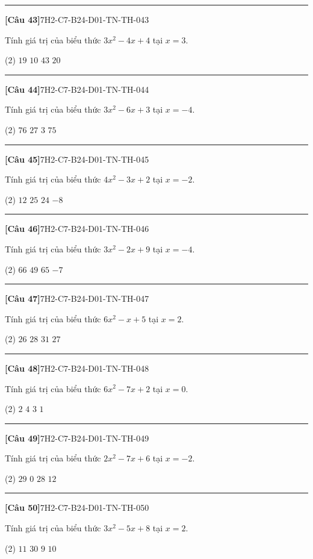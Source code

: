 \documentclass[12pt,a4paper]{article}
\newif\ifloigiai
\newenvironment{cauhoi}[2]{%
  \par\medskip\noindent\rule{\textwidth}{0.4pt}\par\nopagebreak
  \noindent\textbf{[#1]}\hfill{\scriptsize\ttfamily #2}\par\nopagebreak\smallskip}{\par}
\newcommand{\dapan}[1]{\ifloigiai\par\smallskip\noindent\textit{Đáp án:} \textbf{#1}\par\fi}
\begin{document}
\begin{cauhoi}{Câu 43}{7H2-C7-B24-D01-TN-TH-043}
Tính giá trị của biểu thức $3x^{2}-4x+4$ tại $x=3$.
\begin{tasks}(2)
\task $19$
\task $10$
\task $43$
\task $20$
\end{tasks}
\dapan{A}
\end{cauhoi}
\begin{cauhoi}{Câu 44}{7H2-C7-B24-D01-TN-TH-044}
Tính giá trị của biểu thức $3x^{2}-6x+3$ tại $x=-4$.
\begin{tasks}(2)
\task $76$
\task $27$
\task $3$
\task $75$
\end{tasks}
\dapan{D}
\end{cauhoi}
\begin{cauhoi}{Câu 45}{7H2-C7-B24-D01-TN-TH-045}
Tính giá trị của biểu thức $4x^{2}-3x+2$ tại $x=-2$.
\begin{tasks}(2)
\task $12$
\task $25$
\task $24$
\task $-8$
\end{tasks}
\dapan{C}
\end{cauhoi}
\begin{cauhoi}{Câu 46}{7H2-C7-B24-D01-TN-TH-046}
Tính giá trị của biểu thức $3x^{2}-2x+9$ tại $x=-4$.
\begin{tasks}(2)
\task $66$
\task $49$
\task $65$
\task $-7$
\end{tasks}
\dapan{C}
\end{cauhoi}
\begin{cauhoi}{Câu 47}{7H2-C7-B24-D01-TN-TH-047}
Tính giá trị của biểu thức $6x^{2}-x+5$ tại $x=2$.
\begin{tasks}(2)
\task $26$
\task $28$
\task $31$
\task $27$
\end{tasks}
\dapan{D}
\end{cauhoi}
\begin{cauhoi}{Câu 48}{7H2-C7-B24-D01-TN-TH-048}
Tính giá trị của biểu thức $6x^{2}-7x+2$ tại $x=0$.
\begin{tasks}(2)
\task $2$
\task $4$
\task $3$
\task $1$
\end{tasks}
\dapan{A}
\end{cauhoi}
\begin{cauhoi}{Câu 49}{7H2-C7-B24-D01-TN-TH-049}
Tính giá trị của biểu thức $2x^{2}-7x+6$ tại $x=-2$.
\begin{tasks}(2)
\task $29$
\task $0$
\task $28$
\task $12$
\end{tasks}
\dapan{C}
\end{cauhoi}
\begin{cauhoi}{Câu 50}{7H2-C7-B24-D01-TN-TH-050}
Tính giá trị của biểu thức $3x^{2}-5x+8$ tại $x=2$.
\begin{tasks}(2)
\task $11$
\task $30$
\task $9$
\task $10$
\end{tasks}
\dapan{D}
\end{cauhoi}
\end{document}
